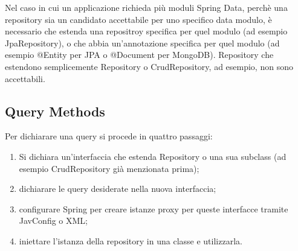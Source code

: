 Nel caso in cui un applicazione richieda più moduli Spring Data, perchè una repository sia un candidato accettabile per uno specifico data modulo, è necessario che estenda una repositroy specifica per quel modulo (ad esempio JpaRepository), o che abbia un'annotazione specifica per quel modulo (ad esempio @Entity per JPA o @Document per MongoDB). Repository che estendono semplicemente Repository o CrudRepository, ad esempio, non sono accettabili.

\subsection{Query Methods}
Per dichiarare una query si procede in quattro passaggi:
\begin{enumerate}
    \item Si dichiara un'interfaccia che estenda Repository o una sua subclass (ad esempio CrudRepository già menzionata prima);
    \item dichiarare le query desiderate nella nuova interfaccia;
    \item configurare Spring per creare istanze proxy per queste interfacce tramite JavConfig o XML;
    \item iniettare l'istanza della repository in una classe e utilizzarla.
\end{enumerate}

